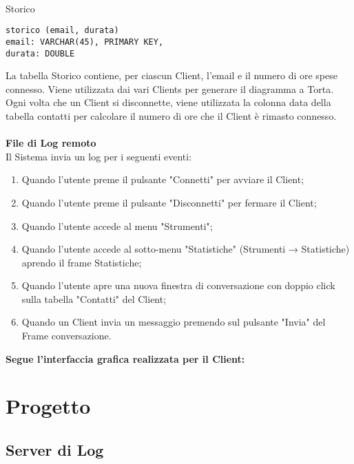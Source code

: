 \documentclass[a4paper, 11pt]{article} %
\begin{document}
\\
Storico
\lstset{language=sql}
\begin{lstlisting}[frame=single]
storico (email, durata)
email: VARCHAR(45), PRIMARY KEY,
durata: DOUBLE
\end{lstlisting}
La tabella Storico contiene, per ciascun Client, l'email e il numero di ore spese connesso.
Viene utilizzata dai vari Clients per generare il diagramma a Torta.\\
Ogni volta che un Client si disconnette, viene utilizzata la colonna data della tabella contatti per calcolare il numero di ore che il Client \`e rimasto connesso.\\
\\
\textbf{File di Log remoto}\\
Il Sistema invia un log per i seguenti eventi:
\begin{enumerate}
\item Quando l'utente preme il pulsante "Connetti" per avviare il Client;
\item Quando l'utente preme il pulsante "Disconnetti" per fermare il Client;
\item Quando l'utente accede al menu "Strumenti";
\item Quando l'utente accede al sotto-menu "Statistiche" (Strumenti → Statistiche) aprendo il frame Statistiche;
\item Quando l'utente apre una nuova finestra di conversazione con doppio click sulla tabella "Contatti" del Client;
\item Quando un Client invia un messaggio premendo sul pulsante "Invia" del Frame conversazione.
\end{enumerate}
\vspace{0.5cm}
\textbf{Segue l'interfaccia grafica realizzata per il Client:}


\newpage
\section{Progetto}

\subsection{Server di Log}
\end{document}
